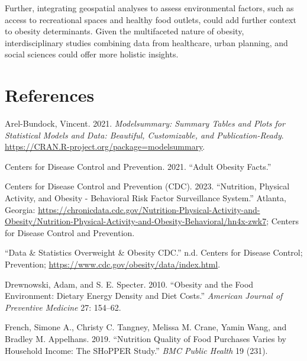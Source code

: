 \documentclass[
  letterpaper,
  DIV=11,
  numbers=noendperiod]{scrartcl}
\newlength{\cslhangindent}
\newlength{\cslentryspacingunit} %
\newenvironment{CSLReferences}[2] %
 {%
  \setlength{\parindent}{0pt}
  \ifodd #1
  \let\oldpar\par
  \def\par{\hangindent=\cslhangindent\oldpar}
  \fi
  \setlength{\parskip}{#2\cslentryspacingunit}
 }%
 {}
\begin{document}
Further, integrating geospatial analyses to assess environmental
factors, such as access to recreational spaces and healthy food outlets,
could add further context to obesity determinants. Given the
multifaceted nature of obesity, interdisciplinary studies combining data
from healthcare, urban planning, and social sciences could offer more
holistic insights. \newpage

\hypertarget{references}{%
\section*{References}\label{references}}

\hypertarget{refs}{}
\begin{CSLReferences}{1}{0}
\leavevmode{}%
Arel-Bundock, Vincent. 2021. \emph{Modelsummary: Summary Tables and
Plots for Statistical Models and Data: Beautiful, Customizable, and
Publication-Ready}.
\url{https://CRAN.R-project.org/package=modelsummary}.

\leavevmode{}%
Centers for Disease Control and Prevention. 2021. {``Adult Obesity
Facts.''}

\leavevmode{}%
Centers for Disease Control and Prevention (CDC). 2023. {``{Nutrition,
Physical Activity, and Obesity - Behavioral Risk Factor Surveillance
System}.''} Atlanta, Georgia:
\url{https://chronicdata.cdc.gov/Nutrition-Physical-Activity-and-Obesity/Nutrition-Physical-Activity-and-Obesity-Behavioral/hn4x-zwk7};
{Centers for Disease Control and Prevention}.

\leavevmode{}%
{``Data \& Statistics \textbar{} Overweight \& Obesity \textbar{}
CDC.''} n.d. Centers for Disease Control; Prevention;
\url{https://www.cdc.gov/obesity/data/index.html}.

\leavevmode{}%
Drewnowski, Adam, and S. E. Specter. 2010. {``Obesity and the Food
Environment: Dietary Energy Density and Diet Costs.''} \emph{American
Journal of Preventive Medicine} 27: 154--62.

\leavevmode{}%
French, Simone A., Christy C. Tangney, Melissa M. Crane, Yamin Wang, and
Bradley M. Appelhans. 2019. {``Nutrition Quality of Food Purchases
Varies by Household Income: The SHoPPER Study.''} \emph{BMC Public
Health} 19 (231).


\end{CSLReferences}
\end{document}
